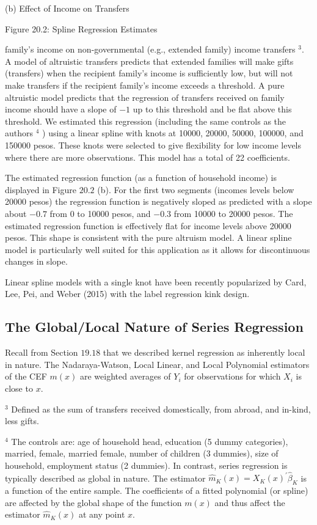 \documentclass[10pt]{article}
\begin{document}
(b) Effect of Income on Transfers

Figure 20.2: Spline Regression Estimates

family's income on non-governmental (e.g., extended family) income transfers ${ }^{3}$. A model of altruistic transfers predicts that extended families will make gifts (transfers) when the recipient family's income is sufficiently low, but will not make transfers if the recipient family's income exceeds a threshold. A pure altruistic model predicts that the regression of transfers received on family income should have a slope of $-1$ up to this threshold and be flat above this threshold. We estimated this regression (including the same controls as the authors ${ }^{4}$ ) using a linear spline with knots at 10000, 20000, 50000, 100000, and 150000 pesos. These knots were selected to give flexibility for low income levels where there are more observations. This model has a total of 22 coefficients.

The estimated regression function (as a function of household income) is displayed in Figure $20.2$ (b). For the first two segments (incomes levels below 20000 pesos) the regression function is negatively sloped as predicted with a slope about $-0.7$ from 0 to 10000 pesos, and $-0.3$ from 10000 to 20000 pesos. The estimated regression function is effectively flat for income levels above 20000 pesos. This shape is consistent with the pure altruism model. A linear spline model is particularly well suited for this application as it allows for discontinuous changes in slope.

Linear spline models with a single knot have been recently popularized by Card, Lee, Pei, and Weber (2015) with the label regression kink design.

\subsection{The Global/Local Nature of Series Regression}
Recall from Section $19.18$ that we described kernel regression as inherently local in nature. The Nadaraya-Watson, Local Linear, and Local Polynomial estimators of the CEF $m(x)$ are weighted averages of $Y_{i}$ for observations for which $X_{i}$ is close to $x$.

${ }^{3}$ Defined as the sum of transfers received domestically, from abroad, and in-kind, less gifts.

${ }^{4}$ The controls are: age of household head, education (5 dummy categories), married, female, married female, number of children (3 dummies), size of household, employment status (2 dummies). In contrast, series regression is typically described as global in nature. The estimator $\widehat{m}_{K}(x)=X_{K}(x)^{\prime} \widehat{\beta}_{K}$ is a function of the entire sample. The coefficients of a fitted polynomial (or spline) are affected by the global shape of the function $m(x)$ and thus affect the estimator $\widehat{m}_{K}(x)$ at any point $x$.
\end{document}
